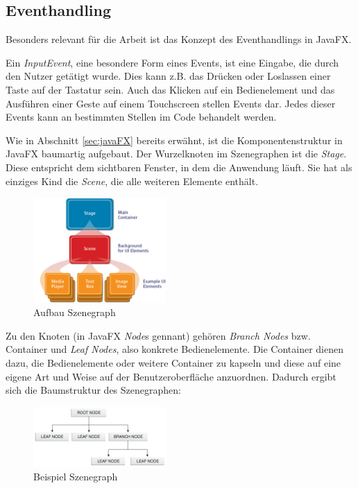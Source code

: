 \subsection{Eventhandling} \label{sec:javafxEventhandling}
Besonders relevant für die Arbeit ist das Konzept des Eventhandlings in JavaFX.\par
Ein \textit{InputEvent}, eine besondere Form eines Events, ist eine Eingabe, die durch den Nutzer getätigt wurde. Dies kann z.B. das Drücken oder Loslassen einer Taste auf der Tastatur sein. Auch das Klicken auf ein Bedienelement und das Ausführen einer Geste auf einem Touchscreen stellen Events dar. Jedes dieser Events kann an bestimmten Stellen im Code behandelt werden.\par
Wie in Abschnitt \ref{sec:javaFX} bereits erwähnt, ist die Komponentenstruktur in JavaFX baumartig aufgebaut. Der Wurzelknoten im Szenegraphen ist die \textit{Stage}. Diese entspricht dem sichtbaren Fenster, in dem die Anwendung läuft. Sie hat als einziges Kind die \textit{Scene}, die alle weiteren Elemente enthält.
\begin{figure}[H]
 \centering
 \includegraphics[width=0.45\textwidth]{grafiken/scenegraph.png}
 \caption[Aufbau Szenegraph]{Aufbau Szenegraph \cite{Jakob2015}}
 \label{fig:scenegraph}
\end{figure} 
Zu den Knoten (in JavaFX \textit{Node}s gennant) gehören \textit{Branch Nodes} bzw. Container und \textit{Leaf Nodes}, also konkrete Bedienelemente. Die Container dienen dazu, die Bedienelemente oder weitere Container zu kapseln und diese auf eine eigene Art und Weise auf der Benutzeroberfläche anzuordnen. Dadurch ergibt sich die Baumstruktur des Szenegraphen:
\begin{figure}[H]
 \centering
 \includegraphics[width=0.45\textwidth]{grafiken/scenegraph2.png}
 \caption[Beispiel Szenegraph]{Beispiel Szenegraph \cite{Hommel2013}}
 \label{fig:scenegraph2}
\end{figure} 
